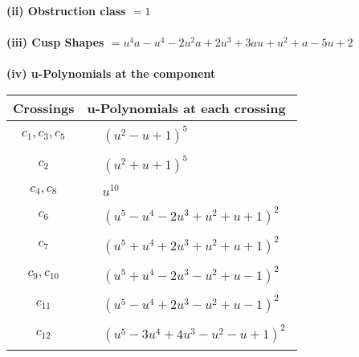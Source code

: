 \documentclass[1p]{elsarticle_modified}
\theoremstyle{definition}
\begin{document}
\flushleft \textbf{(ii) Obstruction class $= 1$}\\~\\
\flushleft \textbf{(iii) Cusp Shapes $= u^4 a- u^4-2 u^2 a+2 u^3+3 a u+u^2+a-5 u+2$}\\~\\
\newpage\renewcommand{\arraystretch}{1}
\flushleft \textbf{(iv) u-Polynomials at the component}\newline \\
\begin{tabular}{m{50pt}|m{274pt}}
Crossings & \hspace{64pt}u-Polynomials at each crossing \\
\hline $$\begin{aligned}c_{1},c_{3},c_{5}\end{aligned}$$&$\begin{aligned}
&(u^2- u+1)^5
\end{aligned}$\\
\hline $$\begin{aligned}c_{2}\end{aligned}$$&$\begin{aligned}
&(u^2+u+1)^5
\end{aligned}$\\
\hline $$\begin{aligned}c_{4},c_{8}\end{aligned}$$&$\begin{aligned}
&u^{10}
\end{aligned}$\\
\hline $$\begin{aligned}c_{6}\end{aligned}$$&$\begin{aligned}
&(u^5- u^4-2 u^3+u^2+u+1)^2
\end{aligned}$\\
\hline $$\begin{aligned}c_{7}\end{aligned}$$&$\begin{aligned}
&(u^5+u^4+2 u^3+u^2+u+1)^2
\end{aligned}$\\
\hline $$\begin{aligned}c_{9},c_{10}\end{aligned}$$&$\begin{aligned}
&(u^5+u^4-2 u^3- u^2+u-1)^2
\end{aligned}$\\
\hline $$\begin{aligned}c_{11}\end{aligned}$$&$\begin{aligned}
&(u^5- u^4+2 u^3- u^2+u-1)^2
\end{aligned}$\\
\hline $$\begin{aligned}c_{12}\end{aligned}$$&$\begin{aligned}
&(u^5-3 u^4+4 u^3- u^2- u+1)^2
\end{aligned}$\\
\hline
\end{tabular}\\~\\
\end{document}
